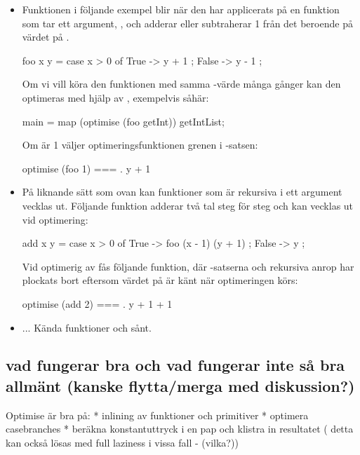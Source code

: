 \documentclass[Rapport]{subfiles}
\begin{document}
\begin{itemize}
\item Funktionen  i följande exempel blir när den har applicerats på 
en funktion som tar ett argument, , och adderar eller subtraherar 1 från
det beroende på värdet på .

\begin{codeEx}
foo x y = case x > 0 of
    { True  -> y + 1
    ; False -> y - 1
    };
\end{codeEx}
Om vi vill köra den funktionen med samma -värde många gånger kan den optimeras
med hjälp av , exempelvis såhär:
\begin{codeEx}
main = map (optimise (foo getInt)) getIntList;
\end{codeEx}
Om  är 1 väljer optimeringsfunktionen grenen  i -satsen:
\begin{codeEx}
optimise (foo 1) === \y . y + 1
\end{codeEx}

\item På liknande sätt som ovan kan funktioner som är rekursiva i ett argument
vecklas ut. Följande funktion adderar två tal steg för steg och kan vecklas ut
vid optimering:

\begin{codeEx}
add x y = case x > 0 of
    { True  -> foo (x - 1) (y + 1)
    ; False -> y
    };
\end{codeEx}

Vid optimerig av  fås följande funktion, där -satserna och 
rekursiva anrop har plockats bort eftersom värdet på  är känt när
optimeringen körs:

\begin{codeEx}
optimise (add 2) === \y . y + 1 + 1
\end{codeEx}

\item ... Kända funktioner och sånt.

\end{itemize}

\subsection{vad fungerar bra och vad fungerar inte så bra allmänt (kanske flytta/merga med diskussion?)}
Optimise är bra på:
    * inlining av funktioner och primitiver
    * optimera casebranches
    * beräkna konstantuttryck i en pap och klistra in resultatet
             ( detta kan också lösas med full laziness i vissa fall - (vilka?))
\end{document}
